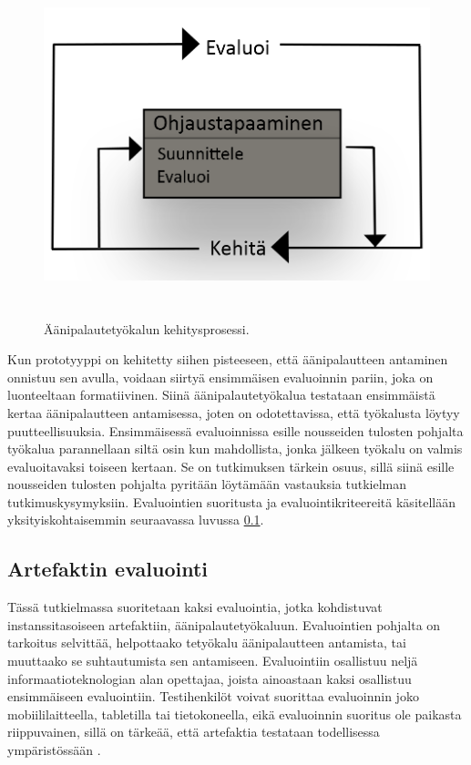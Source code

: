 \documentclass[utf8]{gradu3}
\begin{document}
\begin{figure}[h]\centering
  \includegraphics[height=10cm,keepaspectratio]{Kehitysvaihe}
  \caption{Äänipalautetyökalun kehitysprosessi.}
  \label{fig:kehitys}
\end{figure}

Kun prototyyppi on kehitetty siihen pisteeseen, että äänipalautteen antaminen onnistuu sen avulla, voidaan siirtyä ensimmäisen evaluoinnin pariin, joka on luonteeltaan formatiivinen. Siinä äänipalautetyökalua testataan ensimmäistä kertaa äänipalautteen antamisessa, joten on odotettavissa, että työkalusta löytyy puutteellisuuksia. Ensimmäisessä evaluoinnissa esille nousseiden tulosten pohjalta työkalua parannellaan siltä osin kun mahdollista, jonka jälkeen työkalu on valmis evaluoitavaksi toiseen kertaan. Se on tutkimuksen tärkein osuus, sillä siinä esille nousseiden tulosten pohjalta pyritään löytämään vastauksia tutkielman tutkimuskysymyksiin. Evaluointien suoritusta ja evaluointikriteereitä käsitellään yksityiskohtaisemmin seuraavassa luvussa \ref{eval}.

\subsection{Artefaktin evaluointi}
\label{eval}

Tässä tutkielmassa suoritetaan kaksi evaluointia, jotka kohdistuvat instanssitasoiseen artefaktiin, äänipalautetyökaluun. Evaluointien pohjalta on tarkoitus selvittää, helpottaako tetyökalu äänipalautteen antamista, tai muuttaako se suhtautumista sen antamiseen. Evaluointiin osallistuu neljä informaatioteknologian alan opettajaa, joista ainoastaan kaksi osallistuu ensimmäiseen evaluointiin. Testihenkilöt voivat suorittaa evaluoinnin joko mobiililaitteella, tabletilla tai tietokoneella, eikä evaluoinnin suoritus ole paikasta riippuvainen, sillä on tärkeää, että artefaktia testataan todellisessa ympäristössään \parencite{smith}.
\end{document}
